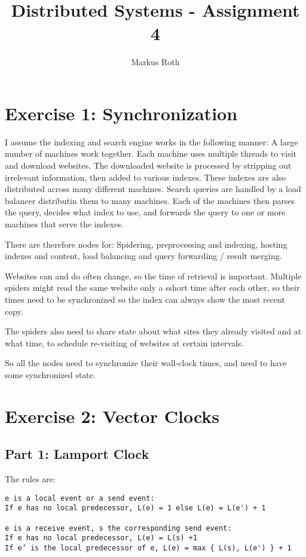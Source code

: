 \documentclass[a4paper]{article}
\title{Distributed Systems - Assignment 4}
\author{Markus Roth}
\begin{document}
\maketitle

\section{Exercise 1: Synchronization}

I assume the indexing and search engine works in the following manner: A large number of machines work together. Each machine uses multiple threads to visit and download websites. The downloaded website is processed by stripping out irrelevant information, then added to various indexes. These indexes are also distributed across many different machines. Search queries are handled by a load balancer distributin them to many machines. Each of the machines then parses the query, decides what index to use, and forwards the query to one or more machines that serve the indexes.

There are therefore nodes for: Spidering, preprocessing and indexing, hosting indexes and content, load balancing and query forwarding / result merging.

Websites can and do often change, so the time of retrieval is important. Multiple spiders might read the same website only a sshort time after each other, so their times need to be synchronized so the index can always show the most recent copy. 

The spiders also need to share state about what sites they already visited and at what time, to schedule re-visiting of websites at certain intervals. 

So all the nodes need to synchronize their wall-clock times, and need to have some synchronized state. 

\section{Exercise 2: Vector Clocks}

\subsection{Part 1: Lamport Clock}

The rules are:

\begin{lstlisting}
e is a local event or a send event:
If e has no local predecessor, L(e) = 1 else L(e) = L(e') + 1

e is a receive event, s the corresponding send event:
If e has no local predecessor, L(e) = L(s) +1
If e’ is the local predecessor of e, L(e) = max { L(s), L(e') } + 1 
\end{lstlisting}
\end{document}
